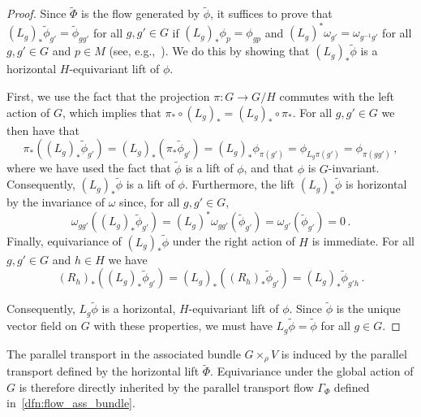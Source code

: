 \documentclass[12pt,a4paper]{article}
\numberwithin{equation}{section}
\theoremstyle{plain}
\theoremstyle{definition}
\theoremstyle{remark}
\begin{document}
\begin{proof}
    Since $\tilde{\Phi}$ is the flow generated by $\tilde{\phi}$, it suffices to prove that $(L_g)_*\tilde{\phi}_{g'}=\tilde{\phi}_{gg'}$ for all $g,g'\in G$ if $(L_g)_*\phi_p = \phi_{gp}$ and $(L_g)^*\omega_{g'}=\omega_{g^{-1}g'}$ for all $g,g'\in G$ and $p \in M$ (see, e.g.,~\cite[Theorem 3.4]{Andersdotter2025}). We do this by showing that $(L_g)_*\tilde{\phi}$ is a horizontal $H$-equivariant lift of $\phi$.

    First, we use the fact that the projection $\pi:G\to G/H$ commutes with the left action of $G$, which implies that $\pi_* \circ (L_g)_* = (L_g)_* \circ \pi_*$. For all $g,g'\in G$ we then have that
    \begin{equation}
        \pi_*\left((L_g)_*\tilde{\phi}_{g'}\right) = (L_g)_*\left(\pi_*\tilde{\phi}_{g'}\right) = (L_g)_*\phi_{\pi(g')} = \phi_{L_g\pi(g')} = \phi_{\pi(gg')}\,,
    \end{equation}
    where we have used the fact that $\tilde{\phi}$ is a lift of $\phi$, and that $\phi$ is $G$-invariant. Consequently, $(L_g)_*\tilde{\phi}$ is a lift of $\phi$. Furthermore, the lift $(L_g)_*\tilde{\phi}$ is horizontal by the invariance of $\omega$ since, for all $g,g' \in G$,
    \begin{equation}
        \omega_{gg'}\left((L_g)_*\tilde{\phi}_{g'}\right) = (L_g)^*\omega_{gg'}(\tilde{\phi}_{g'}) = \omega_{g'}(\tilde{\phi}_{g'}) = 0\,.
    \end{equation}
    Finally, equivariance of $(L_g)_*\tilde{\phi}$ under the right action of $H$ is immediate. For all $g,g' \in G$ and $h \in H$ we have
    \begin{equation}
        (R_h)_*\left((L_g)_*\tilde{\phi}_{g'}\right) = (L_g)_*\left((R_h)_*\tilde{\phi}_{g'}\right) = (L_g)_*\tilde{\phi}_{g'h}\,.
    \end{equation}
    
    Consequently, $L_g\tilde{\phi}$ is a horizontal, $H$-equivariant lift of $\phi$. Since $\tilde{\phi}$ is the unique vector field on $G$ with these properties, we must have $L_g\tilde{\phi} = \tilde{\phi}$ for all $g\in G$.
\end{proof}

The parallel transport in the associated bundle $G \times_{\rho} V$ is induced by the parallel transport defined by the horizontal lift $\tilde{\Phi}$. Equivariance under the global action of $G$ is therefore directly inherited by the parallel transport flow $\Gamma_{\Phi}$ defined in~\cref{dfn:flow_ass_bundle}.
\end{document}

